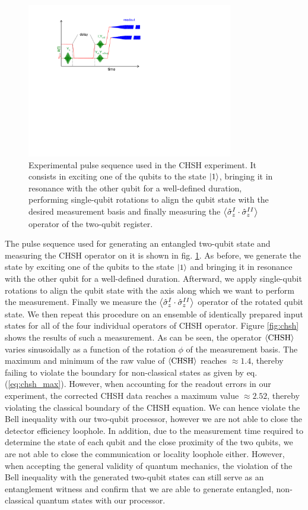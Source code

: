 \begin{figure}
	\centering
	\includegraphics[width=9cm]{"./material/figures/measurement/chsh"}
	\caption[]{Experimental pulse sequence used in the CHSH experiment. It consists in exciting one of the qubits to the state $\left| 1 \right>$, bringing it in resonance with the other qubit for a well-defined duration, performing single-qubit rotations to align the qubit state with the desired measurement basis and finally measuring the $\left< \hat{\sigma}_z^I\cdot\hat{\sigma}_z^{II} \right>$ operator of the two-qubit register.}
	\label{fig:chsh_pulse_sequence}
\end{figure}

The pulse sequence used for generating an entangled two-qubit state and measuring the CHSH operator on it is shown in fig. \ref{fig:chsh_pulse_sequence}. As before, we generate the state by exciting one of the qubits to the state $\left| 1 \right>$ and bringing it in resonance with the other qubit for a well-defined duration. Afterward, we apply single-qubit rotations to align the qubit state with the axis along which we want to perform the measurement. Finally we measure the $\left< \hat{\sigma}_z^I\cdot \hat{\sigma}_z^{II} \right>$ operator of the rotated qubit state. We then repeat this procedure on an ensemble of identically prepared input states for all of the four individual operators of CHSH operator. Figure \ref{fig:chsh} shows the results of such a measurement. As can be seen, the operator $\left< \mathrm{CHSH} \right>$ varies sinusoidally as a function of the rotation $\phi$ of the measurement basis. The maximum and minimum of the raw value of $\left< \mathrm{CHSH} \right>$ reaches $\approx 1.4$, thereby failing to violate the boundary for non-classical states as given by eq. (\ref{eq:chsh_max}). However, when accounting for the readout errors in our experiment, the corrected CHSH data reaches a maximum value $\approx 2.52$, thereby violating the classical boundary of the CHSH equation. We can hence violate the Bell inequality with our two-qubit processor, however we are not able to close the detector efficiency loophole. In addition, due to the measurement time required to determine the state of each qubit and the close proximity of the two qubits, we are not able to close the communication or locality loophole either. However, when accepting the general validity of quantum mechanics, the violation of the Bell inequality with the generated two-qubit states can still serve as an entanglement witness and confirm that we are able to generate entangled, non-classical quantum states with our processor.

